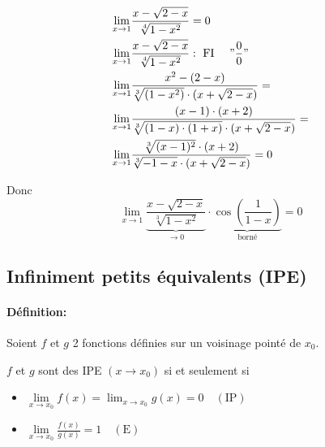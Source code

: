 \documentclass[
    11pt,
    a4paper,
    oneside,
    headinlcude, footinclude,
    twoside,
]{report}
\begin{document}
\begin{center}
\end{center}

\[
\begin{split}
\lim_{x \to  1}& \frac{x - \sqrt{2-x}}{\sqrt[4]{1 - x^{2}}} = 0\\
\lim_{x \to  1}& \frac{x - \sqrt{2-x}}{\sqrt[4]{1 - x^{2}}} : \text{ FI } \quad "\frac{0}{0}"\\
\lim_{x \to  1}& \frac{x^{2} - (2 - x )}{\sqrt[3]{(1-x^{2})}
\cdot (x + \sqrt{2 - x })} = \\
\lim_{x \to  1}&  \frac{(x - 1) \cdot (x + 2)}{\sqrt[3]{(1-x)\cdot(1+x)}
\cdot (x + \sqrt{2 - x })} = \\
\lim_{x \to  1}& \frac{\sqrt[3]{(x-1)^{2}} \cdot (x+2)}{\sqrt[3]{- 1 - x }
\cdot (x + \sqrt{2 - x })} = 0 \\
\end{split}
\]

Donc $$ \lim_{x \to 1} \underbrace{ \frac{x - \sqrt{2 - x }}{\sqrt[3]{ 1 - x ^{2}}}}_{\to 0} \cdot
\underbrace{\cos \left(\frac{1}{1-x}\right)}_{\text{borné}} = 0$$


\subsection{Infiniment petits équivalents (IPE)}
\label{sub:infiniment_petits_equivalents_ipe_}

\paragraph{Définition:}

Soient $f$ et $g$ 2 fonctions définies sur un voisinage pointé de $x_{0}$.

$f$ et $g$ sont des IPE $( x \to x_{0})$ si et seulement si
\begin{itemize}
\item $ \lim\limits_{x \to x_{0}} f(x) = \lim_{x \to x_{0}} g(x) = 0 \quad (\text{IP})$
\item $ \lim\limits_{x \to x_{0}} \frac{f(x)}{g(x)} = 1 \quad (\text{E})$
\end{itemize}
\end{document}
